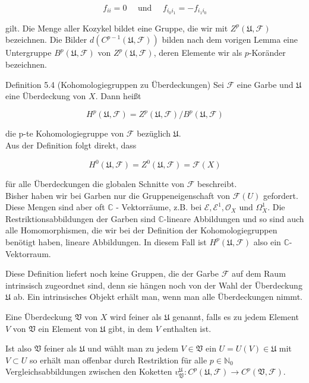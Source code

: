 \documentclass[10pt, letterpaper]{article}
\begin{document}
$$
f_{i i}=0 \quad \text { und } \quad f_{i_{0} i_{1}}=-f_{i_{1} i_{0}}
$$

gilt. Die Menge aller Kozykel bildet eine Gruppe, die wir mit $Z^{p}(\mathfrak{U}, \mathcal{F})$ bezeichnen. Die Bilder $d\left(C^{p-1}(\mathfrak{U}, \mathcal{F})\right)$ bilden nach dem vorigen Lemma eine Untergruppe $B^{p}(\mathfrak{U}, \mathcal{F})$ von $Z^{p}(\mathfrak{U}, \mathcal{F})$, deren Elemente wir als $p$-Koränder bezeichnen.

Definition 5.4 (Kohomologiegruppen zu Überdeckungen) Sei $\mathcal{F}$ eine Garbe und $\mathfrak{U}$ eine Überdeckung von $X$. Dann heißt

$$
H^{p}(\mathfrak{U}, \mathcal{F})=Z^{p}(\mathfrak{U}, \mathcal{F}) / B^{p}(\mathfrak{U}, \mathcal{F})
$$

die p-te Kohomologiegruppe von $\mathcal{F}$ bezüglich $\mathfrak{U}$.\\
Aus der Definition folgt direkt, dass

$$
H^{0}(\mathfrak{U}, \mathcal{F})=Z^{0}(\mathfrak{U}, \mathcal{F})=\mathcal{F}(X)
$$

für alle Überdeckungen die globalen Schnitte von $\mathcal{F}$ beschreibt.\\
Bisher haben wir bei Garben nur die Gruppeneigenschaft von $\mathcal{F}(U)$ gefordert. Diese Mengen sind aber oft $\mathbb{C}$ - Vektorräume, z.B. bei $\mathcal{E}, \mathcal{E}^{1}, \mathcal{O}_{X}$ und $\Omega_{X}^{1}$. Die Restriktionsabbildungen der Garben sind $\mathbb{C}$-lineare Abbildungen und so sind auch alle Homomorphismen, die wir bei der Definition der Kohomologiegruppen benötigt haben, lineare Abbildungen. In diesem Fall ist $H^{p}(\mathfrak{U}, \mathcal{F})$ also ein $\mathbb{C}$-Vektorraum.

Diese Definition liefert noch keine Gruppen, die der Garbe $\mathcal{F}$ auf dem Raum intrinsisch zugeordnet sind, denn sie hängen noch von der Wahl der Überdeckung $\mathfrak{U}$ ab. Ein intrinsisches Objekt erhält man, wenn man alle Überdeckungen nimmt.

Eine Überdeckung $\mathfrak{V}$ von $X$ wird feiner als $\mathfrak{U}$ genannt, falls es zu jedem Element $V$ von $\mathfrak{V}$ ein Element von $\mathfrak{U}$ gibt, in dem $V$ enthalten ist.

Ist also $\mathfrak{V}$ feiner als $\mathfrak{U}$ und wählt man zu jedem $V \in \mathfrak{V}$ ein $U=U(V) \in \mathfrak{U}$ mit $V \subset U$ so erhält man offenbar durch Restriktion für alle $p \in \mathbb{N}_{0}$ Vergleichsabbildungen zwischen den Koketten $v_{\mathfrak{V}}^{\mathfrak{U}}: C^{p}(\mathfrak{U}, \mathcal{F}) \rightarrow C^{p}(\mathfrak{V}, \mathcal{F})$.
\end{document}
